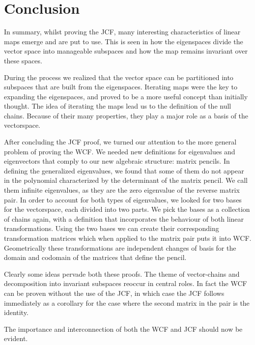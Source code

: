 \section*{Conclusion}

In summary, whilst proving the JCF, many interesting characteristics of linear maps emerge and are put to use. This is seen in how the eigenspaces divide the vector space into manageable subspaces and how the map remains invariant over these spaces.

During the process we realized that the vector space can be partitioned into subspaces that are built from the eigenspaces. Iterating maps were the key to expanding the eigenspaces, and proved to be a more useful concept than initially thought. The idea of iterating the maps lead us to the definition of the null chains. Because of their many properties, they play a major role as a basis of the vectorspace. 

After concluding the JCF proof, we turned our attention to the more general problem of proving the WCF.
We needed new definitions for eigenvalues and eigenvectors that comply to our new algebraic structure: matrix pencils. In defining the generalized eigenvalues, we found that some of them do not appear in the polynomial characterized by the determinant of the matrix pencil.
We call them infinite eigenvalues, as they are the zero eigenvalue of the reverse matrix pair.
In order to account for both types of eigenvalues, we looked for two bases for the vectorspace, each divided into two parts.
We pick the bases as a collection of chains again, with a definition that incorporates the behaviour of both linear transformations.
Using the two bases we can create their corresponding transformation matrices which when applied to the matrix pair puts it into WCF. Geometrically these transformations are independent changes of basis for the domain and codomain of the matrices that define the pencil.

Clearly some ideas pervade both these proofs. The theme of vector-chains and decomposition into invariant subspaces reoccur in central roles. In fact the WCF can be proven without the use of the JCF, in which case the JCF follows immediately as a corollary for the case where the second matrix in the pair is the identity.

The importance and interconnection of both the WCF and JCF should now be evident. 




